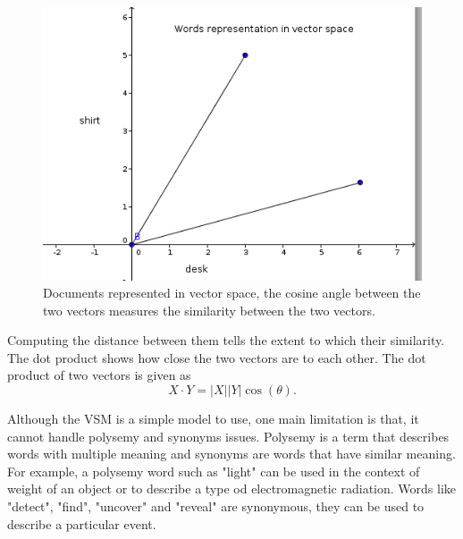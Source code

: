 \begin{figure}[hbtp]
\centering
\includegraphics[scale=0.5]{words_in_vs.png}
\caption{Documents represented in vector space, the  cosine angle between the two vectors measures the similarity between the two vectors.}
\end{figure}
\label{figure 2.1}
Computing the distance between them tells the extent to which their similarity. The dot product shows how close the two vectors are to each other. The dot product of two vectors is given as
$$X\cdot Y=|X||Y|\cos (\theta) \text{.}$$

Although the VSM is a simple model to use, one main limitation is that, it cannot handle polysemy and synonyms issues. Polysemy is a term that describes words with multiple meaning and synonyms are words that have similar meaning.
For example, a polysemy word such as "light" can be used in the context of weight of an object or to describe a type od electromagnetic radiation.
Words like "detect", "find", "uncover" and "reveal" are synonymous, they can be used to describe a particular event.

